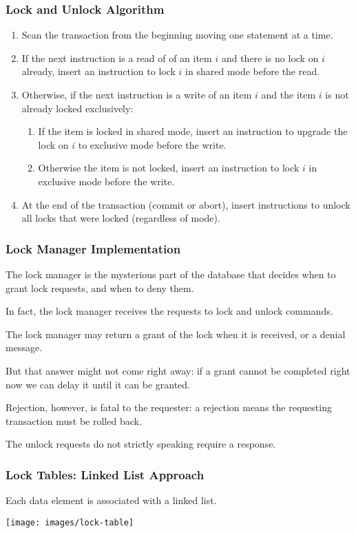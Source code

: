 \begin{frame}
\frametitle{Lock and Unlock Algorithm}

\begin{enumerate}
	\item Scan the transaction from the beginning moving one statement at a time.
	\item If the next instruction is a read of of an item $i$ and there is no lock on $i$ already, insert an instruction to lock $i$ in shared mode before the read.
	\item Otherwise, if the next instruction is a write of an item $i$ and the item $i$ is not already locked exclusively:
		\begin{enumerate}
			\item If the item is locked in shared mode, insert an instruction to upgrade the lock on $i$ to exclusive mode before the write.
			\item Otherwise the item is not locked, insert an instruction to lock $i$ in exclusive mode before the write.
		\end{enumerate}
	\item At the end of the transaction (commit or abort), insert instructions to unlock all locks that were locked (regardless of mode).
\end{enumerate}


\end{frame}

\begin{frame}
\frametitle{Lock Manager Implementation}

The lock manager is the mysterious part of the database that decides when to grant lock requests, and when to deny them. 

In fact, the lock manager receives the requests to lock and unlock commands. 

The lock manager may return a grant of the lock when it is received, or a denial message. 

But that answer might not come right away: if a grant cannot be completed right now we can delay it until it can be granted. 

Rejection, however, is fatal to the requester: a rejection means the requesting transaction must be rolled back. 

The unlock requests do not strictly speaking require a response.


\end{frame}

\begin{frame}
\frametitle{Lock Tables: Linked List Approach}

Each data element is associated with a linked list. 



\begin{center}
	\texttt{[image: images/lock-table]}
\end{center}


\end{frame}

